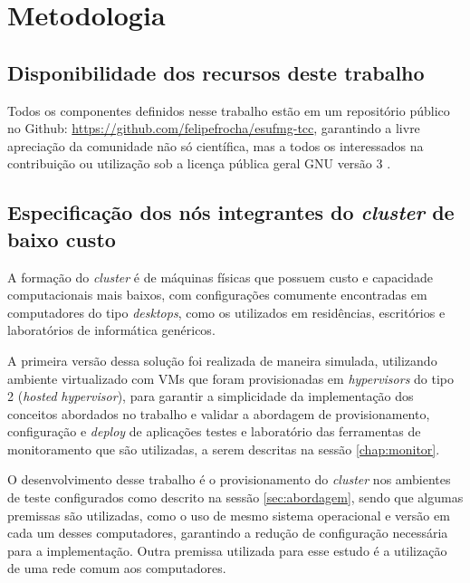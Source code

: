 
\chapter{Metodologia}
\label{chap:metodologia}
\section{Disponibilidade dos recursos deste trabalho}

Todos os componentes definidos nesse trabalho estão em um repositório público no  Github: \href{https://github.com/felipefrocha/esufmg-tcc}{https://github.com/felipefrocha/esufmg-tcc}, garantindo a livre apreciação da comunidade não só científica, mas a todos os interessados na contribuição ou utilização sob a licença pública geral GNU versão 3 \cite{foss2022}.

\section{Especificação dos nós integrantes do  \emph{cluster} de baixo custo}

A formação do  \emph{cluster} é de máquinas físicas que possuem custo e capacidade computacionais mais baixos, com configurações comumente encontradas em computadores do tipo \emph{desktops}, como os utilizados em residências, escritórios e laboratórios de informática genéricos.

A primeira versão dessa solução foi realizada de maneira simulada, utilizando ambiente virtualizado com VMs que foram provisionadas em \emph{hypervisors} do tipo 2 \cite{comer_cloud_2021} (\emph{hosted} \emph{hypervisor}), para garantir a simplicidade da implementação dos conceitos abordados no trabalho e validar a abordagem de provisionamento, configuração e \emph{deploy} de aplicações testes e laboratório das ferramentas de monitoramento que são utilizadas, a serem descritas na sessão \ref{chap:monitor}.

O desenvolvimento desse trabalho é o provisionamento do  \emph{cluster} nos ambientes de teste configurados como descrito na sessão \ref{sec:abordagem}, sendo que algumas premissas são utilizadas, como o uso de mesmo sistema operacional e versão em cada um desses computadores, garantindo a redução de configuração necessária para a implementação. Outra premissa utilizada para esse estudo é a utilização de uma rede comum aos computadores.

